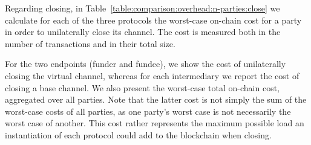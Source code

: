%


  Regarding closing,
%
  in Table~\ref{table:comparison:overhead:n-parties:close} we
  calculate for each of the three protocols the worst-case on-chain cost for a party
  in order to unilaterally close its channel. The cost is
  measured both in the number of transactions and in their total size.

  For the two endpoints (funder and fundee), we show the cost of unilaterally
  closing the virtual channel, whereas for each intermediary we
  report the cost of closing a base channel. We also present the worst-case
  total on-chain cost,
  aggregated over all parties. Note that the latter cost is not simply the sum
  of the worst-case costs of all parties, as one party's worst case is not
  necessarily the worst case of another. This cost rather represents the maximum
  possible load an instantiation of each protocol could add to the blockchain
  when closing.

